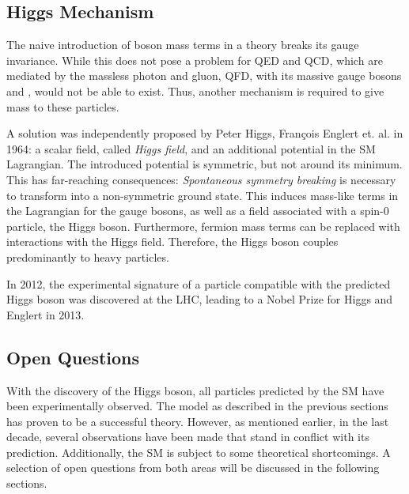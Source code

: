 \subsection{Higgs Mechanism}
The naive introduction of boson mass terms in a theory breaks its gauge invariance. While this does not pose a problem for \ac{QED} and \ac{QCD}, which are mediated by the massless photon and gluon, \ac{QFD}, with its massive gauge bosons \PW and \PZ, would not be able to exist.
Thus, another mechanism is required to give mass to these particles.

A solution was independently proposed by Peter Higgs\cite{Higgs:BrokenSymmetriesMasses}, François Englert et. al. \cite{Englert:BrokenSymmetryMass} in 1964: a scalar field, called \emph{Higgs field}, and an additional potential in the \ac{SM} Lagrangian. The introduced potential is symmetric, but not around its minimum. This has far-reaching consequences: \emph{Spontaneous symmetry breaking} is necessary to transform into a non-symmetric ground state. This induces mass-like terms in the Lagrangian for the gauge bosons, as well as a field associated with a \mbox{spin-0} particle, the Higgs boson. Furthermore, fermion mass terms can be replaced with interactions with the Higgs field. Therefore, the Higgs boson couples predominantly to heavy particles.

In 2012, the experimental signature of a particle compatible with the predicted Higgs boson was discovered at the \ac{LHC}\cite{CMSCollaboration:Observationnewboson,ATLASCollaboration:Observationnewparticle}, leading to a Nobel Prize for Higgs and Englert in 2013\cite{NobelMedia:NobelPrize2013}.

\subsection{Open Questions}
\label{sec:open_questions}

With the discovery of the Higgs boson, all particles predicted by the \acl{SM} have been experimentally observed. The model as described in the previous sections has proven to be a successful theory. 
However, as mentioned earlier, in the last decade, several observations have been made that stand in conflict with its prediction. Additionally, the \acl{SM} is subject to some theoretical shortcomings. A selection of open questions from both areas will be discussed in the following sections.


